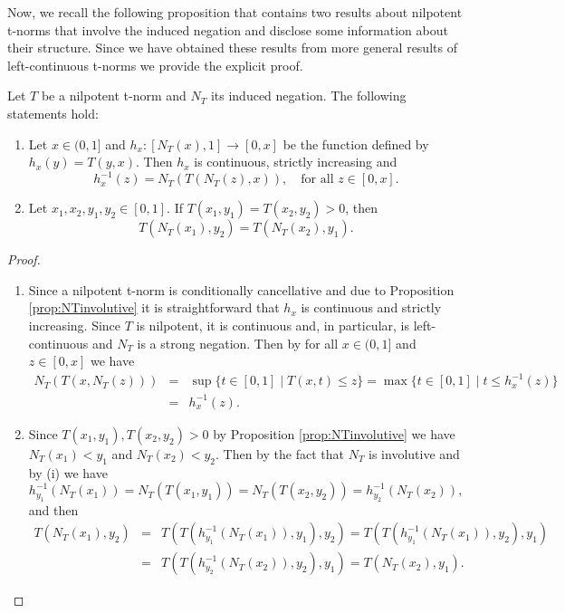 Now, we recall the following proposition that contains two results about nilpotent t-norms that involve the induced negation and disclose some information about their structure. Since we have obtained these results from more general results of left-continuous t-norms we provide the explicit proof.

\begin{proposition}
	\label{prop:PropertiesNT}
	Let $T$ be a nilpotent t-norm and $N_T$ its induced negation. The following statements hold:
	\begin{enumerate}[label=(\roman*)]
		\item Let $x \in (0,1]$ and $h_x : [N_T(x),1] \to [0,x]$ be the function defined by $h_x(y)=T(y,x)$. Then $h_x$ is continuous, strictly increasing and
		$$h_x^{-1}(z)=N_T(T(N_T(z),x)), \quad \text{for all } z \in [0,x].$$
		\item Let $x_1,x_2,y_1,y_2 \in [0,1]$. If $T(x_1,y_1)=T(x_2,y_2)>0$, then 
		$$T(N_T(x_1),y_2)=T(N_T(x_2),y_1).$$
	\end{enumerate}
\end{proposition}

\begin{proof}
	\begin{enumerate}[label=(\roman*)]
		\item Since a nilpotent t-norm is conditionally cancellative and due to Proposition \ref{prop:NTinvolutive} it is straightforward that $h_x$ is continuous and strictly increasing. Since $T$ is nilpotent, it is continuous and, in particular, is left-continuous and $N_T$ is a strong negation. Then by \cite[(i)-Theorem 2]{Jenei1998} for all $x \in (0,1]$ and $z \in[0,x]$ we have
		\begin{eqnarray*}
		N_T(T(x,N_T(z))) &=& \sup \{ t \in [0,1] \mid T(x,t) \leq z\} = \max \{t \in [0,1] \mid t \leq h_x^{-1}(z)\} \\
		&=& h_x^{-1}(z).
		\end{eqnarray*}
		\item Since $T(x_1,y_1), T(x_2,y_2)>0$ by Proposition \ref{prop:NTinvolutive} we have $N_T(x_1)<y_1$ and $N_T(x_2)<y_2$. Then by the fact that $N_T$ is involutive and by (i) we have
		$$h_{y_1}^{-1}(N_T(x_1))=N_T(T(x_1,y_1))=N_T(T(x_2,y_2))=h_{y_2}^{-1}(N_T(x_2)),$$
		and then
		\begin{eqnarray*}
			T(N_T(x_1),y_2) & = & T(T(h_{y_1}^{-1}(N_T(x_1)),y_1),y_2) = T(T(h_{y_1}^{-1}(N_T(x_1)),y_2),y_1) \\
			& = & T(T(h_{y_2}^{-1}(N_T(x_2)),y_2),y_1) = T(N_T(x_2),y_1).
		\end{eqnarray*}
	\end{enumerate}
\end{proof}

